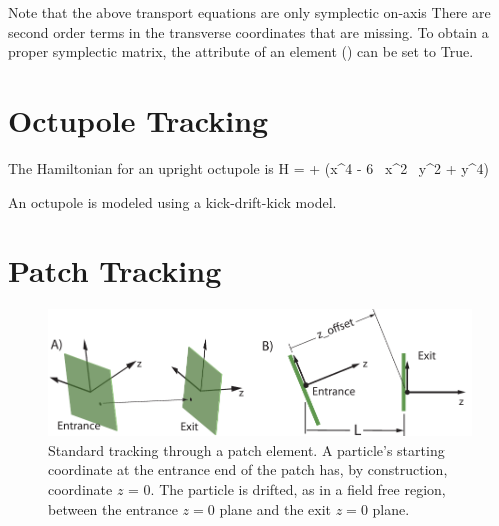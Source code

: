 Note that the above transport equations are only symplectic on-axis
There are second order terms in the transverse coordinates that are
missing. To obtain a proper symplectic matrix, the 
attribute of an  element () can be set to
True.

\section{Octupole Tracking}
\label{s:octupole.std}

The Hamiltonian for an upright octupole is
\Begineq
  H =  +  (x^4 - 6 \, x^2 \, y^2 + y^4)
\Endeq

An octupole is modeled using a kick-drift-kick model.

\section{Patch Tracking}
\label{s:patch.std}

\begin{figure}[tb]
  \centering
  \includegraphics[width=5in]{patch.pdf}
  \caption[Standard patch transformation.]
{Standard tracking through a patch element. A particle's starting coordinate at
the entrance end of the patch has, by construction, coordinate $z$ =
0. The particle is drifted, as in a field free region, between the
entrance $z = 0$ plane and the exit $z = 0$ plane.}
  \label{f:patch.track}
\end{figure}


